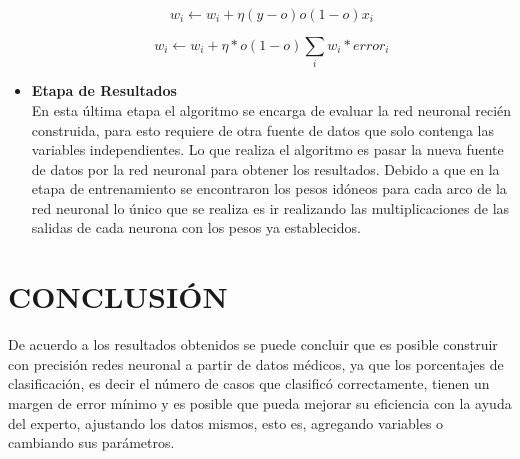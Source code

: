 \documentclass[letterpaper, 10 pt, conference]{ieeeconf}
\begin{document}
\begin{itemize}[leftmargin=*]
    \begin{equation} \label{eq3}
            w_i \leftarrow w_i+\eta(y-o)o(1-o)x_i
    \end{equation}          
    
    \begin{equation} \label{eq4}
            w_i \leftarrow w_i+\eta*o(1-o)\sum_{i}{w_i*error_i}
    \end{equation}       
    
    \item \textbf{Etapa de Resultados}
    \\ En esta última etapa el algoritmo se encarga de evaluar la red neuronal recién construida, para esto requiere de otra fuente de datos que solo contenga las variables independientes. Lo que realiza el algoritmo es pasar la nueva fuente de datos por la red neuronal para obtener los resultados. Debido a que en la etapa de entrenamiento se encontraron los pesos idóneos para cada arco de la red neuronal lo único que se realiza es ir realizando las multiplicaciones de las salidas de cada neurona con los pesos ya establecidos.
\end{itemize}

\section{CONCLUSIÓN}

De acuerdo a los resultados obtenidos se puede concluir que es posible construir con precisión redes neuronal a partir de datos médicos, ya que los porcentajes de clasificación, es decir el número de casos que clasificó correctamente, tienen un margen de error mínimo y es posible que pueda mejorar su eficiencia con la ayuda del experto, ajustando los datos mismos, esto es, agregando variables o cambiando sus parámetros.\\
\end{document}

